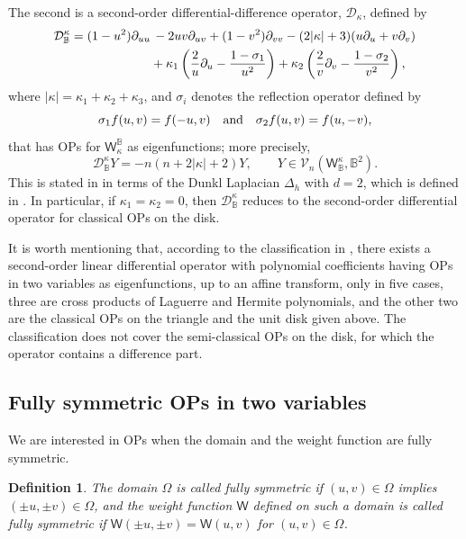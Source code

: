 \documentclass{amsart}
\newtheorem{defn}[thm]{Definition}
\theoremstyle{remark}
\def\sW{{\mathsf W}}
\def\k{{\kappa}}
\def\s{\sigma}
\def\CD{{\mathcal D}}
\def\CV{{\mathcal V}}
\def\BB{{\mathbb B}}
\begin{document}
The second is a second-order differential-difference operator, $\CD_\k$, defined by
\begin{align}\label{eq:diffB2}
  \CD^\k_\BB =  (1-u^2)\partial_{uu}  &\, - 2 u v \partial_{uv} + (1-v^2)\partial_{vv} - (2 |\k| + 3) (u \partial_u + v \partial_v) \\
     & + \k_1 \left(\frac 2 u \partial_u - \frac{1-\s_1}{u^2} \right)+\k_2 \left(\frac 2 v \partial_v - \frac{1-\s_2}{v^2} \right), \notag
\end{align}
where $|\k|  = \k_1+\k_2+\k_3$, and $\s_i$ denotes the reflection operator defined by
$$
  \s_1 f(u,v) = f(-u,v) \quad \hbox{and} \quad   \s_2 f(u,v) = f(u,-v), 
$$
that has OPs for $\sW_\k^\BB$ as eigenfunctions; more precisely, 
\begin{equation}\label{eq:eigenB2}
   \CD^\k_\BB Y = - n (n+ 2 |\k| + 2) Y, \qquad Y\in \CV_n(\sW^\k_\BB, \BB^2).
\end{equation}
This is stated in \cite[Theorem 8.1.3]{DX} in terms of the Dunkl Laplacian $\Delta_h$ with $d =2$, which is defined in 
\cite[(8.1.6)]{DX}. In particular, if $\k_1 = \k_2 =0$, then $\CD^\k_\BB$ reduces to the second-order differential operator
for classical OPs on the disk. 

It is worth mentioning that, according to the classification in \cite{KS}, there exists a second-order linear differential 
operator with polynomial coefficients having OPs in two variables as eigenfunctions, up to an affine transform,
only in five cases, three are cross products of Laguerre and Hermite polynomials, and the other two are the classical 
OPs on the triangle and the unit disk given above. The classification does not cover the semi-classical OPs on the disk,
for which the operator contains a difference part. 
 
\subsection{Fully symmetric OPs in two variables} 
We are interested in OPs when the domain and the weight function are fully symmetric. 

\begin{defn}
The domain $\Omega$ is called fully symmetric if $(u, v) \in \Omega$ implies $(\pm u, \pm v) \in \Omega$, and
the weight function $\sW$ defined on such a domain is called fully symmetric if $\sW(\pm u, \pm v) = 
\sW(u,v)$ for $(u,v) \in \Omega$.  
\end{defn}
\end{document}
